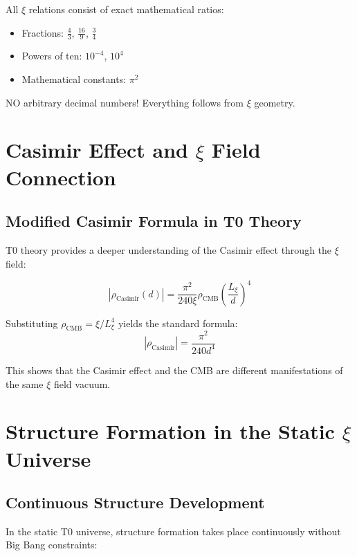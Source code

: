 	\begin{important}
		All $\xi$ relations consist of exact mathematical ratios:
		\begin{itemize}
			\item Fractions: $\frac{4}{3}$, $\frac{16}{9}$, $\frac{3}{4}$
			\item Powers of ten: $10^{-4}$, $10^4$
			\item Mathematical constants: $\pi^2$
		\end{itemize}
		NO arbitrary decimal numbers! Everything follows from $\xi$ geometry.
	\end{important}
	\section{Casimir Effect and $\xi$ Field Connection}
	
	\subsection{Modified Casimir Formula in T0 Theory}
	
	T0 theory provides a deeper understanding of the Casimir effect through the $\xi$ field:
	
	\begin{equation}
		|\rho_{\text{Casimir}}(d)| = \frac{\pi^2}{240 \xi} \rho_{\text{CMB}} \left(\frac{L_\xi}{d}\right)^4
	\end{equation}
	
	Substituting $\rho_{\text{CMB}} = \xi/L_\xi^4$ yields the standard formula:
	\begin{equation}
		|\rho_{\text{Casimir}}| = \frac{\pi^2}{240 d^4}
	\end{equation}
	
	This shows that the Casimir effect and the CMB are different manifestations of the same $\xi$ field vacuum.
	
	\section{Structure Formation in the Static $\xi$ Universe}
	
	\subsection{Continuous Structure Development}
	
	In the static T0 universe, structure formation takes place continuously without Big Bang constraints:
	
